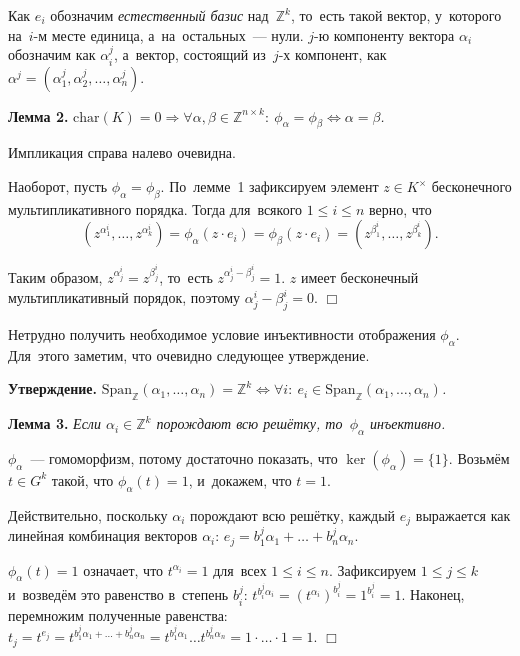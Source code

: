 \documentclass[twoside]{article}
\begin{document}
Как $e_i$ обозначим \textit{естественный базис} над~$\mathbb{Z}^k$, то~есть такой вектор, у~которого на~$i$-м месте единица, а~на~остальных~— нули.
$j$-ю компоненту вектора $\alpha_i$ обозначим как $\alpha_i^j$, а~вектор, состоящий из~$j$-х компонент,
как $\alpha^j = (\alpha_1^j, \alpha_2^j, \ldots, \alpha_n^j)$.

\medskip\noindent\textbf{Лемма 2.}\emph{
    $
        \mathrm{char}(K) = 0 \Rightarrow \forall \alpha, \beta \in \mathbb{Z}^{n \times k}{:} \ \phi_\alpha = \phi_\beta \Leftrightarrow \alpha = \beta
    $.
}\medskip

    Импликация справа налево очевидна.

    Наоборот, пусть $\phi_\alpha = \phi_\beta$. По~лемме~1 зафиксируем
    элемент $z \in K^\times$ бесконечного мультипликативного порядка.
    Тогда для~всякого $1 \leq i \leq n$ верно, что
    $$
        (z^{\alpha_1^i}, \ldots, z^{\alpha_k^i}) = \phi_\alpha(z \cdot e_i) = \phi_\beta(z \cdot e_i) = (z^{\beta_1^i}, \ldots, z^{\beta_k^i}).
    $$

    Таким образом, $z^{\alpha_j^i} = z^{\beta_j^i}$, то~есть $z^{\alpha_j^i - \beta_j^i} = 1$.
    $z$ имеет бесконечный мультипликативный порядок, поэтому $\alpha_j^i - \beta_j^i = 0$.
\hfill$\Box$\medskip

Нетрудно получить необходимое условие инъективности отображения $\phi_\alpha$.
Для~этого заметим, что очевидно следующее утверждение.

\medskip\noindent\textbf{Утверждение.}\emph{
    $\mathrm{Span}_\mathbb{Z}(\alpha_1, \ldots, \alpha_n) = \mathbb{Z}^k \Leftrightarrow \forall i{:}\ e_i \in \mathrm{Span}_\mathbb{Z}(\alpha_1, \ldots, \alpha_n)$.
}

\medskip\noindent\textbf{Лемма 3.}\emph{
    Если $\alpha_i \in \mathbb{Z}^k$ порождают всю решётку, то~$\phi_\alpha$ инъективно.
}\medskip

    $\phi_\alpha$~— гомоморфизм, потому достаточно показать, что $\ker(\phi_\alpha) = \{1\}$.
    Возьмём $t \in G^k$ такой, что $\phi_\alpha(t) = 1$, и~докажем, что $t = 1$.

    Действительно, поскольку $\alpha_i$ порождают всю решётку, каждый $e_j$ выражается как линейная комбинация векторов $\alpha_i$:
    $
        e_j = b^j_1 \alpha_1 + \ldots + b^j_n \alpha_n.
    $

    $\phi_\alpha(t) = 1$ означает, что $t^{\alpha_i} = 1$ для~всех $1 \leq i \leq n$.
    Зафиксируем $1 \leq j \leq k$ и~возведём это равенство в~степень $b^j_i$: $t^{b^j_i \alpha_i} = (t^{\alpha_i})^{b^j_i} = 1^{b^j_i} = 1$.
    Наконец, перемножим полученные равенства:
    $
        t_j = t^{e_j} = t^{b^j_1 \alpha_1 + \ldots + b^j_n \alpha_n} = t^{b^j_1 \alpha_1} \ldots t^{b^j_n \alpha_n} = 1 \cdot \ldots \cdot 1 = 1.
    $
\hfill$\Box$\medskip
\end{document}
